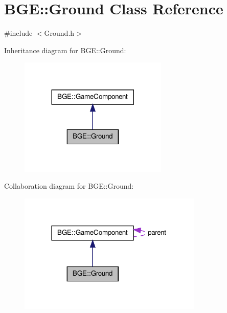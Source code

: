 \hypertarget{class_b_g_e_1_1_ground}{\section{B\-G\-E\-:\-:Ground Class Reference}
\label{class_b_g_e_1_1_ground}
}


{\ttfamily \#include $<$Ground.\-h$>$}



Inheritance diagram for B\-G\-E\-:\-:Ground\-:
\nopagebreak
\begin{figure}[H]
\begin{center}
\leavevmode
\includegraphics[width=200pt]{class_b_g_e_1_1_ground__inherit__graph}
\end{center}
\end{figure}


Collaboration diagram for B\-G\-E\-:\-:Ground\-:
\nopagebreak
\begin{figure}[H]
\begin{center}
\leavevmode
\includegraphics[width=249pt]{class_b_g_e_1_1_ground__coll__graph}
\end{center}
\end{figure}
